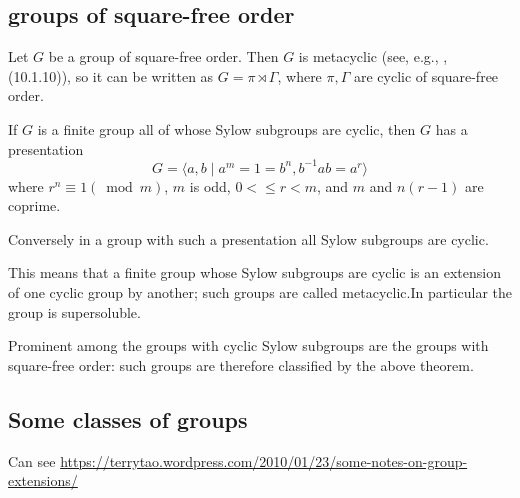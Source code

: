 \subsection{groups of square-free order}
Let $G$ be a group of square-free order. Then $G$ is metacyclic (see, e.g., \cite{Robinson1982A}, (10.1.10)), so it can be written as $G = \pi \rtimes \Gamma$, where $\pi, \Gamma$ are cyclic of square-free order.
\begin{theorem}
If  $G$ is a finite  group all of whose Sylow subgroups are cyclic, then $G$ has a  presentation
\[G = \langle a, b\mid a^m = 1 = b^n, b^{-1}ab = a^r \rangle\]
where $r^n \equiv 1 (\bmod m)$, $m$ is odd, $0 <\leq r < m$, and $m$ and $n(r - 1)$ are coprime.

Conversely in a group with such a presentation  all Sylow subgroups  are
cyclic.
\end{theorem}
This means that a finite group whose Sylow subgroups are cyclic is an extension of one cyclic group by another; such groups are called  metacyclic.In particular the group is supersoluble.

Prominent among the groups with cyclic Sylow subgroups are the groups
with square-free order: such groups are therefore classified by the above theorem.




\subsection{Some classes of groups} %
\label{subsec:some_classes_of_groups}
Can see \url{https://terrytao.wordpress.com/2010/01/23/some-notes-on-group-extensions/}

